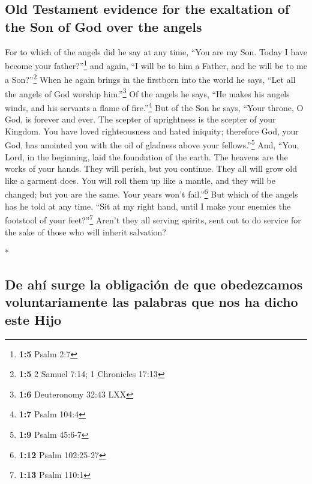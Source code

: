 \begin{paracol}{2}
\begin{otherlanguage}{english}
\hypertarget{old-testament-evidence-for-the-exaltation-of-the-son-of-god-over-the-angels}{%
\subsection{Old Testament evidence for the exaltation of the Son of God
over the
angels}\label{old-testament-evidence-for-the-exaltation-of-the-son-of-god-over-the-angels}}

 For to which of the angels did he say at any time, ``You
are my Son. Today I have become your father?''\footnote{\textbf{1:5}
  Psalm 2:7} and again, ``I will be to him a Father, and he will be to
me a Son?''\footnote{\textbf{1:5} 2 Samuel 7:14; 1 Chronicles 17:13}
 When he again brings in the firstborn into the world he
says, ``Let all the angels of God worship him.''\footnote{\textbf{1:6}
  Deuteronomy 32:43 LXX}  Of the angels he says, ``He
makes his angels winds, and his servants a flame of fire.''\footnote{\textbf{1:7}
  Psalm 104:4}  But of the Son he says, ``Your throne, O
God, is forever and ever. The scepter of uprightness is the scepter of
your Kingdom.  You have loved righteousness and hated
iniquity; therefore God, your God, has anointed you with the oil of
gladness above your fellows.''\footnote{\textbf{1:9} Psalm 45:6-7}
 And, ``You, Lord, in the beginning, laid the foundation
of the earth. The heavens are the works of your hands. 
They will perish, but you continue. They all will grow old like a
garment does.  You will roll them up like a mantle, and
they will be changed; but you are the same. Your years won't
fail.''\footnote{\textbf{1:12} Psalm 102:25-27}  But
which of the angels has he told at any time, ``Sit at my right hand,
until I make your enemies the footstool of your feet?''\footnote{\textbf{1:13}
  Psalm 110:1}  Aren't they all serving spirits, sent out
to do service for the sake of those who will inherit salvation?

\end{otherlanguage}

\switchcolumn[0]*

\hypertarget{de-ahuxed-surge-la-obligaciuxf3n-de-que-obedezcamos-voluntariamente-las-palabras-que-nos-ha-dicho-este-hijo}{%
\subsection{De ahí surge la obligación de que obedezcamos
voluntariamente las palabras que nos ha dicho este
Hijo}\label{de-ahuxed-surge-la-obligaciuxf3n-de-que-obedezcamos-voluntariamente-las-palabras-que-nos-ha-dicho-este-hijo}}


\end{paracol}
